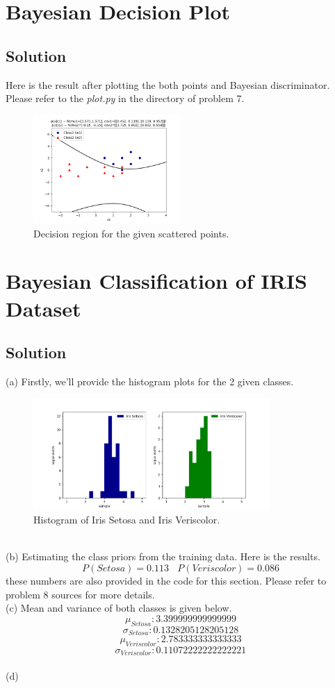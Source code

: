 \documentclass[12pt]{article}
\numberwithin{equation}{section}
\numberwithin{table}{section}
\numberwithin{figure}{section}
\begin{document}
\newpage
\section{Bayesian Decision Plot}
\subsection*{Solution}
Here is the result after plotting the both points and Bayesian discriminator. Please refer to the \textit{plot.py} in the directory of problem 7.
\begin{figure}[!h]\centering
	\includegraphics[width=0.5\textwidth]{7.png}
	\caption{Decision region for the given scattered points.}
	\label{pl7}
\end{figure}

\section{Bayesian Classification of IRIS Dataset}
\subsection*{Solution}
(a) Firstly, we'll provide the histogram plots for the 2 given classes.
\begin{figure}[!h]\centering
	\includegraphics[width=0.8\textwidth]{8_1.png}
	\caption{Histogram of Iris Setosa and Iris Veriscolor.}
	\label{pl8}
\end{figure}\\
(b) Estimating the class priors from the training data. Here is the results.
$$
	P(Setosa) = 0.113 \ \ \ \ P(Veriscolor) = 0.086
$$ 
these numbers are also provided in the code for this section. Please refer to problem 8 sources for more details.\\
(c) Mean and variance of both classes is given below.
$$
	\mu_{Setosa}:  3.399999999999999
$$
$$
	\sigma_{Setosa}:  0.1328205128205128
$$
$$
	\mu_{Veriscolor}:  2.783333333333333
$$
$$
	\sigma_{Veriscolor}:  0.11072222222222221
$$\\
(d) 
\end{document}
